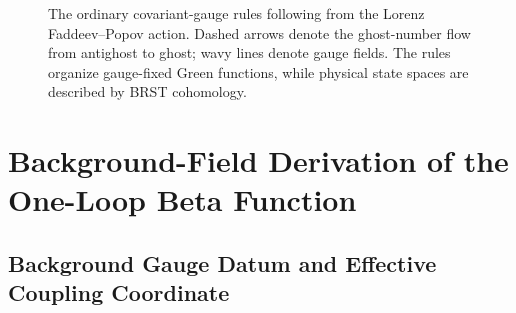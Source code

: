 \begin{figure}[H]
{
  }
  \caption{The ordinary covariant-gauge rules following from the Lorenz
  Faddeev--Popov action.  Dashed arrows denote the ghost-number flow from
  antighost to ghost; wavy lines denote gauge fields.  The rules organize
  gauge-fixed Green functions, while physical state spaces are described by
  BRST cohomology.}
  \label{fig:qcd-ordinary-covariant-gauge-rules}
\end{figure}

\section{Background-Field Derivation of the One-Loop Beta Function}

\subsection{Background Gauge Datum and Effective Coupling Coordinate}
\label{subsec:qcd-background-gauge-effective-coupling}

